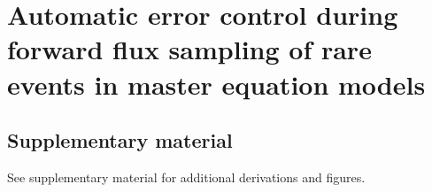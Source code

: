 


%

\chapter{Automatic error control during forward flux sampling of rare events in master equation models}





%

%

\section*{Supplementary material}
See supplementary material for additional derivations and figures.

